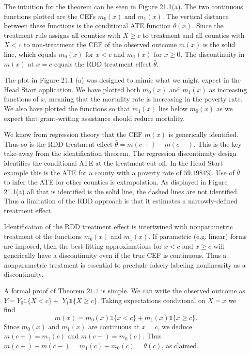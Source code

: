 \documentclass[10pt]{article}
\begin{document}
The intuition for the theorem can be seen in Figure 21.1(a). The two continuous functions plotted are the CEFs $m_{0}(x)$ and $m_{1}(x)$. The vertical distance between these functions is the conditional ATE function $\theta(x)$. Since the treatment rule assigns all counties with $X \geq c$ to treatment and all counties with $X<c$ to non-treatment the CEF of the observed outcome $m(x)$ is the solid line, which equals $m_{0}(x)$ for $x<c$ and $m_{1}(x)$ for $x \geq 0$. The discontinuity in $m(x)$ at $x=c$ equals the RDD treatment effect $\bar{\theta}$.

The plot in Figure 21.1 (a) was designed to mimic what we might expect in the Head Start application. We have plotted both $m_{0}(x)$ and $m_{1}(x)$ as increasing functions of $x$, meaning that the mortality rate is increasing in the poverty rate. We also have plotted the functions so that $m_{1}(x)$ lies below $m_{0}(x)$ as we expect that grant-writing assistance should reduce mortality.

We know from regression theory that the CEF $m(x)$ is generically identified. Thus so is the RDD treatment effect $\bar{\theta}=m(c+)-m(c-)$. This is the key take-away from the identification theorem. The regression discontinuity design identifies the conditional ATE at the treatment cut-off. In the Head Start example this is the ATE for a county with a poverty rate of $59.1984 \%$. Use of $\bar{\theta}$ to infer the ATE for other counties is extrapolation. As displayed in Figure 21.1(a) all that is identified is the solid line, the dashed lines are not identified. Thus a limitation of the RDD approach is that it estimates a narrowly-defined treatment effect.

Identification of the RDD treatment effect is intertwined with nonparametric treatment of the functions $m_{0}(x)$ and $m_{1}(x)$. If parametric (e.g. linear) forms are imposed, then the best-fitting approximations for $x<c$ and $x \geq c$ will generically have a discontinuity even if the true CEF is continuous. Thus a nonparametric treatment is essential to preclude falsely labeling nonlinearity as a discontinuity.

A formal proof of Theorem $21.1$ is simple. We can write the observed outcome as $Y=Y_{0} \mathbb{1}\{X<c\}+$ $Y_{1} \mathbb{1}\{X \geq c\}$. Taking expectations conditional on $X=x$ we find
$$
m(x)=m_{0}(x) \mathbb{1}\{x<c\}+m_{1}(x) \mathbb{1}\{x \geq c\} .
$$
Since $m_{0}(x)$ and $m_{1}(x)$ are continuous at $x=c$, we deduce $m(c+)=m_{1}(c)$ and $m(c-)=m_{0}(c)$. Thus $m(c+)-m(c-)=m_{1}(c)-m_{0}(c)=\theta(c)$, as claimed.
\end{document}

